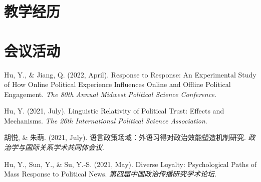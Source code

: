 \documentclass[11pt,a4paper,]{awesome-cv}
\begin{document}
\hypertarget{ux6559ux5b66ux7ecfux5386}{%
\section{教学经历}\label{ux6559ux5b66ux7ecfux5386}}

\begin{cventries}
    \vspace{-4.0mm}
    \vspace{-4.0mm}
    \vspace{-4.0mm}
    \vspace{-4.0mm}
    \vspace{-4.0mm}
    \vspace{-4.0mm}
\end{cventries}

\hypertarget{ux4f1aux8baeux6d3bux52a8}{%
\section{会议活动}\label{ux4f1aux8baeux6d3bux52a8}}

\begingroup
\setlength{\parindent}{-0.5in}
\setlength{\leftskip}{0.5in}

\hypertarget{bibliography}{}
\leavevmode{}%
Hu, Y., \& Jiang, Q. (2022, April). Response to Response: An
Experimental Study of How Online Political Experience Influences Online
and Offline Political Engagement. \emph{The 80th Annual Midwest
Political Science Conference}.

\leavevmode{}%
Hu, Y. (2021, July). Linguistic Relativity of Political Trust: Effects
and Mechanisms. \emph{The 26th International Political Science
Association}.

\leavevmode{}%
胡悦, \& 朱萌. (2021, July).
语言政策场域：外语习得对政治效能塑造机制研究.
\emph{政治学与国际关系学术共同体会议}.

\leavevmode{}%
Hu, Y., Sun, Y., \& Su, Y.-S. (2021, May). Diverse Loyalty:
Psychological Paths of Mass Response to Political News.
\emph{第四届中国政治传播研究学术论坛}.
\end{document}
